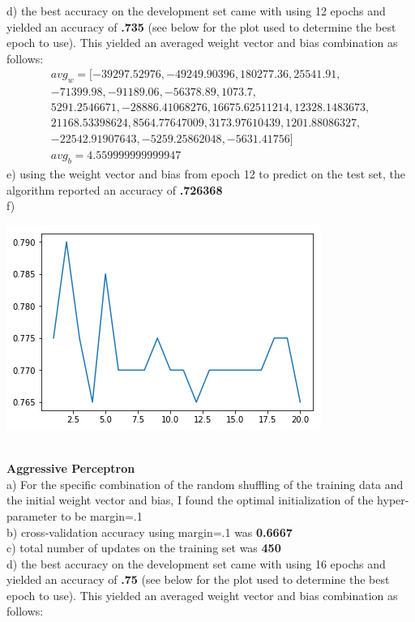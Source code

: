 \documentclass[11pt,a4paper]{article}
\begin{document}
\begin{enumerate}
			d) the best accuracy on the development set came with using 12 epochs and yielded an accuracy of \textbf{.735} (see below for the plot used to determine the best epoch to use). This yielded an averaged weight vector and bias combination as follows:\\
			\begin{gather}
			avg_w = [-39297.52976   , -49249.90396   , 180277.36      ,  25541.91      ,\\
         -71399.98      , -91189.06      , -56378.89      ,   1073.7       ,\\
           5291.2546671 , -28886.41068276,  16675.62511214,  12328.1483673 ,\\
          21168.53398624,   8564.77647009,   3173.97610439,   1201.88086327,\\
         -22542.91907643,  -5259.25862048,  -5631.41756   ] \\
			avg_b = 4.559999999999947
			\end{gather}
			e) using the weight vector and bias from epoch 12 to predict on the test set, the algorithm reported an accuracy of \textbf{.726368} \\
			f)
			\begin{center}
				\includegraphics[width=0.7\linewidth]{average_plot}
			\end{center}
			~\\
			\textbf{Aggressive Perceptron}    \\
			a) For the specific combination of the random shuffling of the training data and the initial weight vector and bias, I found the optimal initialization of the hyper-parameter to be margin=.1  \\
			b) cross-validation accuracy using margin=.1 was \textbf{0.6667}\\
			c) total number of updates on the training set was \textbf{450}\\
			d) the best accuracy on the development set came with using 16 epochs and yielded an accuracy of \textbf{.75} (see below for the plot used to determine the best epoch to use). This yielded an averaged weight vector and bias combination as follows:\\

\end{enumerate}
\end{document}
